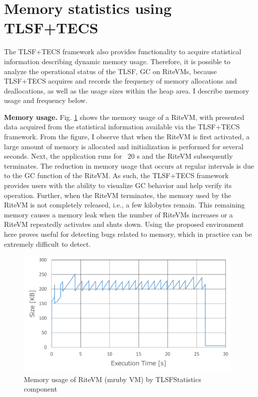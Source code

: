 \documentclass[a4j,12pt,oneside,openany,english]{jsbook}
\begin{document}
\section{Memory statistics using TLSF+TECS}

The TLSF+TECS framework also provides functionality to acquire statistical information describing dynamic memory usage.
Therefore, it is possible to analyze the operational status of the TLSF, GC on RiteVMs, because TLSF+TECS acquires and records the frequency of memory allocations and deallocations, as well as the usage sizes within the heap area.
I describe memory usage and frequency below.

{\bf Memory usage.}
Fig. \ref{fig:EvaluationOfTLSFStatistics} shows the memory usage of a RiteVM, with presented data acquired from the statistical information available via the TLSF+TECS framework.
From the figure, I observe that when the RiteVM is first activated, a large amount of memory is allocated and initialization is performed for several seconds.
Next, the application runs for ~20 s and the RiteVM subsequently terminates.
The reduction in memory usage that occurs at regular intervals is due to the GC function of the RiteVM.
As such, the TLSF+TECS framework provides users with the ability to visualize GC behavior and help verify its operation.
Further, when the RiteVM terminates, the memory used by the RiteVM is not completely released, i.e., a few kilobytes remain.
This remaining memory causes a memory leak when the number of RiteVMs increases or a RiteVM repeatedly activates and shuts down.
Using the proposed environment here proves useful for detecting bugs related to memory, which in practice can be extremely difficult to detect.

\begin{figure}[t]
    \centering
    \includegraphics[width=11cm,clip]{figure/EvaluationOfTLSFStatistics.pdf}
    \caption{Memory usage of RiteVM (mruby VM) by TLSFStatistics component}
    \label{fig:EvaluationOfTLSFStatistics}
\end{figure}
\end{document}
